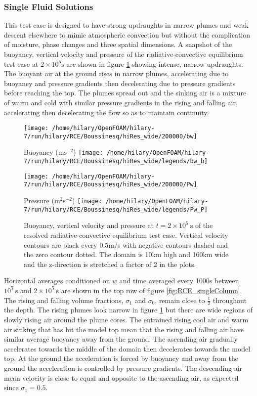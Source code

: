 \documentclass[draft]{agujournal2019}
\begin{document}
\subsubsection{Single Fluid Solutions}

This test case is designed to have strong updraughts in narrow plumes
and weak descent elsewhere to mimic atmospheric convection but without
the complication of moisture, phase changes and three spatial dimensions.
A snapshot of the buoyancy, vertical velocity and pressure of the
radiative-convective equilibrium test case at $2\times10^{5}\text{s}$
are shown in figure \ref{fig:RCE_resolved} showing intense, narrow
updraughts. The buoyant air at the ground rises in narrow plumes,
accelerating due to buoyancy and pressure gradients then decelerating
due to pressure gradients before reaching the top. The plumes spread
out and the sinking air is a mixture of warm and cold with similar
pressure gradients in the rising and falling air, accelerating then
decelerating the flow so as to maintain continuity. 

\noindent 
\begin{figure}
\texttt{[image: /home/hilary/OpenFOAM/hilary-7/run/hilary/RCE/Boussinesq/hiRes\_wide/200000/bw]}

Buoyancy ($\text{m}\text{s}^{-2}$) \texttt{[image: /home/hilary/OpenFOAM/hilary-7/run/hilary/RCE/Boussinesq/hiRes\_wide/legends/bw\_b]}

\texttt{[image: /home/hilary/OpenFOAM/hilary-7/run/hilary/RCE/Boussinesq/hiRes\_wide/200000/Pw]}

Pressure ($\text{m}^{2}\text{s}^{-2}$) \texttt{[image: /home/hilary/OpenFOAM/hilary-7/run/hilary/RCE/Boussinesq/hiRes\_wide/legends/Pw\_P]}

\caption{Buoyancy, vertical velocity and pressure at $t=2\times10^{5}\ \text{s}$
of the resolved radiative-convective equilibrium test case. Vertical
velocity contours are black every 0.5m/s with negative contours dashed
and the zero contour dotted. The domain is 10km high and 160km wide
and the z-direction is stretched a factor of 2 in the plots. \label{fig:RCE_resolved}}
\end{figure}

Horizontal averages conditioned on $w$ and time averaged every 1000s
between $10^{5}\ \text{s}$ and $2\times10^{5}\ \text{s}$ are shown
in the top row of figure \ref{fig:RCE_singleColumn}. The rising and
falling volume fractions, $\sigma_{1}$ and $\sigma_{0}$, remain
close to $\frac{1}{2}$ throughout the depth. The rising plumes look
narrow in figure \ref{fig:RCE_resolved} but there are wide regions
of slowly rising air around the plume cores. The entrained rising
cool air and warm air sinking that has hit the model top mean that
the rising and falling air have similar average buoyancy away from
the ground. The ascending air gradually accelerates towards the middle
of the domain then decelerates towards the model top. At the ground
the acceleration is forced by buoyancy and away from the ground the
acceleration is controlled by pressure gradients. The descending air
mean velocity is close to equal and opposite to the ascending air,
as expected since $\sigma_{1}=0.5$.
\end{document}
